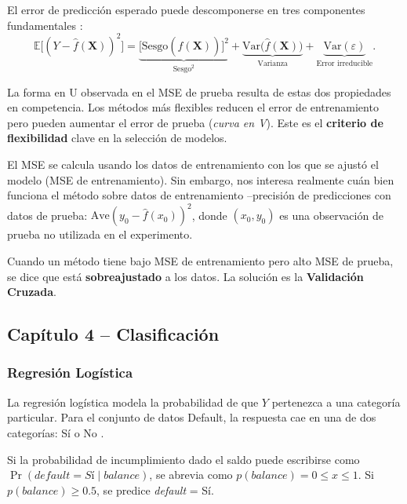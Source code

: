 \documentclass[12pt, a4paper]{article}
\newcommand{\X}{\mathbf{X}}
\begin{document}
El error de predicción esperado puede descomponerse en tres
componentes fundamentales \citep[Sec.~2.2]{islp2023}:
\begin{equation}
  \mathbb{E}\bigl[(Y - \hat{f}(\X))^2\bigr] =
  \underbrace{\bigl[\mathrm{Sesgo}(\hat{f}(\X))\bigr]^2}_{\text{Sesgo}^2}
  + \underbrace{\mathrm{Var}\bigl(\hat{f}(\X)\bigr)}_{\text{Varianza}}
  + \underbrace{\mathrm{Var}(\varepsilon)}_{\text{Error irreducible}}.
  \label{eq:bias_variance}
\end{equation}

La forma en U observada en el MSE de prueba resulta de estas dos
propiedades en competencia. Los métodos más flexibles reducen el
error de entrenamiento pero pueden aumentar el error de prueba
(\textit{curva en V}). Este es el \textbf{criterio de flexibilidad}
clave en la selección de modelos.

El MSE se calcula usando los datos de entrenamiento con los que se
ajustó el modelo (MSE de entrenamiento). Sin embargo, nos interesa
realmente cuán bien funciona el método sobre datos de entrenamiento
--precisión de predicciones con datos de prueba:
$\mathrm{Ave}(y_0 - \hat{f}(x_0))^2$, donde $(x_0, y_0)$ es una
observación de prueba no utilizada en el experimento.

Cuando un método tiene bajo MSE de entrenamiento pero alto MSE de
prueba, se dice que está \textbf{sobreajustado} a los datos.
La solución es la \textbf{Validación Cruzada}.

\subsection{Capítulo 4 -- Clasificación}
\label{subsec:cap4}

\subsubsection{Regresión Logística}

La regresión logística modela la probabilidad de que $Y$ pertenezca
a una categoría particular. Para el conjunto de datos Default, la
respuesta cae en una de dos categorías: Sí o No
\citep[Cap.~4]{islp2023}.

Si la probabilidad de incumplimiento dado el saldo puede escribirse
como $\Pr(\textit{default} = \textit{Sí} \mid \textit{balance})$, se
abrevia como $p(\textit{balance}) = 0 \leq x \leq 1$. Si
$p(\textit{balance}) \geq 0.5$, se predice \textit{default} = Sí.
\end{document}
